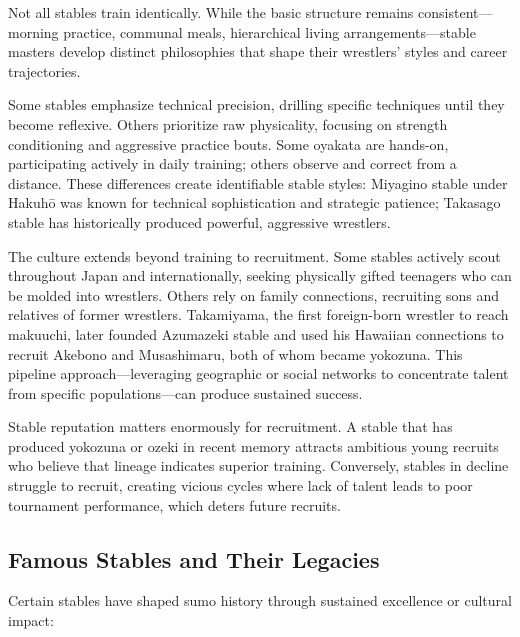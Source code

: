 Not all stables train identically. While the basic structure remains consistent—morning practice, communal meals, hierarchical living arrangements—stable masters develop distinct philosophies that shape their wrestlers' styles and career trajectories.

Some stables emphasize technical precision, drilling specific techniques until they become reflexive. Others prioritize raw physicality, focusing on strength conditioning and aggressive practice bouts. Some oyakata are hands-on, participating actively in daily training; others observe and correct from a distance. These differences create identifiable stable styles: Miyagino stable under Hakuhō was known for technical sophistication and strategic patience; Takasago stable has historically produced powerful, aggressive wrestlers.

The culture extends beyond training to recruitment. Some stables actively scout throughout Japan and internationally, seeking physically gifted teenagers who can be molded into wrestlers. Others rely on family connections, recruiting sons and relatives of former wrestlers. Takamiyama, the first foreign-born wrestler to reach makuuchi, later founded Azumazeki stable and used his Hawaiian connections to recruit Akebono and Musashimaru, both of whom became yokozuna. This pipeline approach—leveraging geographic or social networks to concentrate talent from specific populations—can produce sustained success.

Stable reputation matters enormously for recruitment. A stable that has produced yokozuna or ozeki in recent memory attracts ambitious young recruits who believe that lineage indicates superior training. Conversely, stables in decline struggle to recruit, creating vicious cycles where lack of talent leads to poor tournament performance, which deters future recruits.

\subsection{Famous Stables and Their Legacies}

Certain stables have shaped sumo history through sustained excellence or cultural impact:

